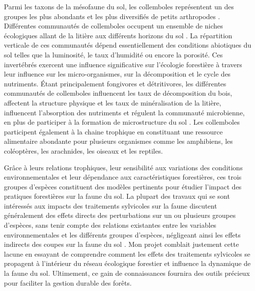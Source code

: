 Parmi les taxons de la mésofaune du sol, les collemboles représentent un des groupes les plus abondants et les plus diversifiés de petits arthropodes \citep{rusekBiodiversityCollembolaTheir1998}. 
Différentes communautés de collemboles occupent un ensemble de niches écologiques allant de la litière aux différents horizons du sol \citep{pongeVerticalDistributionCollembola2000}.
La répartition verticale de ces communautés dépend essentiellement des conditions abiotiques du sol telles que la luminosité, le taux d’humidité ou encore la porosité.
Ces invertébrés exercent une influence significative sur l'écologie forestière à travers leur influence sur les micro-organismes, sur la décomposition et le cycle des nutriments.
Étant principalement fongivores et détritivores, les différentes communautés de collemboles influencent les taux de décomposition du bois, affectent la structure physique et les taux de minéralisation de la litière, 
influencent l'absorption des nutriments et régulent la communauté microbienne, en plus de participer à la formation de microstructure du sol \citep{Petersen1982comparativeanalysis,Neher2012Linkinginvertebrate,Maass2015Functionalrole,Potapov2016Connectingtaxonomy}. 
Les collemboles participent également à la chaine trophique en constituant une ressource alimentaire abondante pour plusieurs organismes comme les amphibiens, les coléoptères, les arachnides, les oiseaux et les reptiles.

Grâce à leurs relations trophiques, leur sensibilité aux variations des conditions environnementales et leur dépendance aux caractéristiques forestières, ces trois groupes d'espèces constituent des modèles pertinents pour étudier l'impact des pratiques forestières sur la faune du sol. 
La plupart des travaux qui se sont intéressés aux impacts des traitements sylvicoles sur la faune discutent généralement des effets directs des perturbations sur un ou plusieurs groupes d'espèces, 
sans tenir compte des relations existantes entre les variables environnementales et les différents groupes d'espèces, 
négligeant ainsi les effets indirects des coupes sur la faune du sol \citep{josephIntegratingOccupancyModels2016,Pollierer2021Diversityfunctional,Kudrin2023metaanalysiseffects}. 
Mon projet comblait justement cette lacune en essayant de comprendre comment les effets des traitements sylvicoles se propagent à l’intérieur du réseau écologique forestier et influence la dynamique de la faune du sol.  
Ultimement, ce gain de connaissances fournira des outils précieux pour faciliter la gestion durable des forêts.


